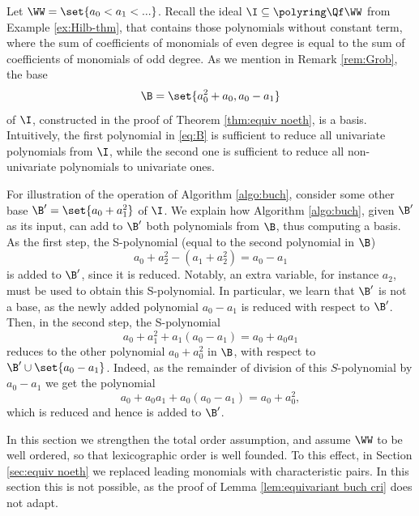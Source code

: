 \begin{slexample} \label{ex:Hilb-thm-cont}
Let $\WW = \set{a_0 < a_1 < ...}$.
Recall the ideal $\I \subseteq \polyring \Qf \WW$ from Example \ref{ex:Hilb-thm},
that contains those polynomials 
   without constant term, where the sum of coefficients of monomials of even degree 
   is equal to the sum of coefficients of monomials of odd degree.
   As we mention in Remark \ref{rem:Grob}, the base
   \begin{align}\label{eq:B}
   \B=\set{a_0^2 + a_0, a_0 - a_1}
   \end{align}
   of $\I$,
   constructed in the proof of Theorem \ref{thm:equiv noeth}, 
   is a \Gr basis. 
   Intuitively, the first polynomial in \eqref{eq:B} is sufficient to reduce all univariate polynomials from $\I$,
   while the second one is sufficient to reduce all non-univariate polynomials to univariate ones.
   
   For illustration of the operation of Algorithm \ref{algo:buch}, consider 
   some other base $\B' = \set{a_0 + a_1^2}$ of $\I$.
   We explain how Algorithm \ref{algo:buch}, given $\B'$ as its input,  
   can add to $\B'$ both polynomials from $\B$, thus computing a \Gr basis.
   As the first step, the S-polynomial (equal to the second polynomial in $\B$) 
   $$a_0 + a_2^2 - (a_1 + a_2^2) = a_0 - a_1$$ 
   is added to $\B'$, since it is reduced. Notably, an extra variable, for instance $a_2$, 
   must be used to obtain this S-polynomial.
   In particular, we learn that $\B'$ is not a \Gr base, as the newly added polynomial $a_0 - a_1$
    is reduced with respect to $\B'$.
   Then, in the second step, the
   S-polynomial 
   $$a_0 + a_1^2 + a_1(a_0 - a_1) = a_0 + a_0 a_1$$ 
   reduces 
   to the other polynomial $a_0 + a_0^2$ in $\B$,
   with respect to $\B' \cup \set{a_0-a_1}$.
   Indeed, as the remainder of division of this $S$-polynomial by $a_0-a_1$ we get 
   the polynomial
   \[
   a_0 + a_0 a_1 + a_0 (a_0-a_1) = a_0 + a_0^2,
   \]
   which is reduced and hence is added to $\B'$.
\end{slexample}


\begin{remark} \rm
In this section we strengthen the total order assumption, and assume $\WW$ to be well ordered,
so that lexicographic order is well founded.
To this effect, in Section \ref{sec:equiv noeth} we replaced leading
monomials with characteristic pairs.
In this section this is not possible, as the proof of Lemma \ref{lem:equivariant buch cri}
does not adapt.
\end{remark}

